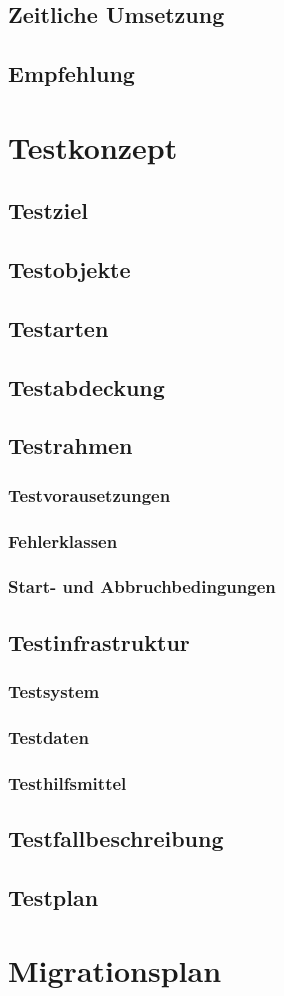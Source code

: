 \subsection{Zeitliche Umsetzung}
\subsection{Empfehlung}

\section{Testkonzept}
\subsection{Testziel}
\subsection{Testobjekte}
\subsection{Testarten}
\subsection{Testabdeckung}
\subsection{Testrahmen}
\subsubsection{Testvorausetzungen}
\subsubsection{Fehlerklassen}
\subsubsection{Start- und Abbruchbedingungen}
\subsection{Testinfrastruktur}
\subsubsection{Testsystem}
\subsubsection{Testdaten}
\subsubsection{Testhilfsmittel}
\subsection{Testfallbeschreibung}
\subsection{Testplan}

\section{Migrationsplan}
